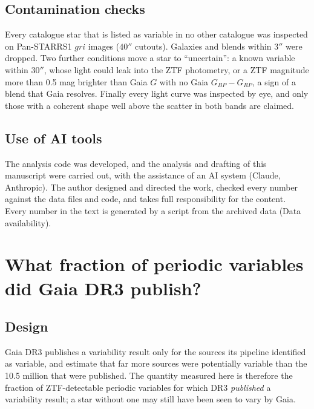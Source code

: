 \documentclass[twocolumn]{searchchev_preprint}
\begin{document}
\subsection{Contamination checks}
Every catalogue star that is listed as variable in no other catalogue was inspected on Pan-STARRS1 \citep{Chambers2016} $gri$
images ($40''$ cutouts). Galaxies and blends within $3''$ were dropped. Two further conditions move a star to
``uncertain'': a known variable within $30''$, whose light could leak into the ZTF photometry, or a ZTF magnitude more
than 0.5 mag brighter than Gaia $G$ with no Gaia $G_{BP}-G_{RP}$, a sign of a blend that Gaia resolves. Finally every
light curve was inspected by eye, and only those with a coherent shape well above the scatter in both bands are
claimed.

\subsection{Use of AI tools}
The analysis code was developed, and the analysis and drafting of this manuscript were carried out, with the
assistance of an AI system (Claude, Anthropic). The author designed and directed the work, checked every number
against the data files and code, and takes full responsibility for the content. Every number in the text is generated
by a script from the archived data (Data availability).

\section{What fraction of periodic variables did Gaia DR3 publish?}\label{sec:sf}
\subsection{Design}
Gaia DR3 publishes a variability result only for the sources its pipeline identified as variable, and \citet{Eyer2023}
estimate that far more sources were potentially variable than the 10.5 million that were published. The quantity
measured here is therefore the fraction of ZTF-detectable periodic variables for which DR3 \emph{published} a
variability result; a star without one may still have been seen to vary by Gaia.
\end{document}
